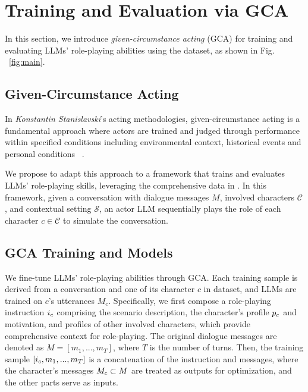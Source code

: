 
\section{Training and Evaluation via GCA}
\label{sec:method}

In this section, we introduce \textit{given-circumstance acting} (GCA) for training and evaluating LLMs' role-playing abilities using the \method dataset, as shown in Fig. ~\ref{fig:main}. 


\subsection{Given-Circumstance Acting}
\label{sec:gca}

In \textit{Konstantin Stanislavski}'s acting methodologies, given-circumstance acting is a fundamental approach where actors are trained and judged through performance within specified conditions including environmental context, historical events and personal conditions ~\citep{stanislavski2008actor}. 

We propose to adapt this approach to a framework that trains and evaluates LLMs' role-playing skills, leveraging the comprehensive data in \method.
In this framework, given a conversation with dialogue messages $M$, involved characters $\mathcal{C}$, and contextual setting $\mathcal{S}$, an actor LLM sequentially plays the role of each character $c\in\mathcal{C}$ to simulate the conversation. 

\subsection{GCA Training and \method Models}
\label{sec:training}

We fine-tune LLMs' role-playing abilities through GCA.  
Each training sample is derived from a conversation and one of its character $c$ in \method dataset, and LLMs are trained on $c$'s utterances $M_c$. 
Specifically, we first compose a role-playing instruction $i_c$ comprising the scenario description, the character's profile $p_c$ and motivation, and profiles of other involved characters,  which provide comprehensive context for role-playing. 
The original dialogue messages are denoted as $M=[m_1, ..., m_T]$, where $T$ is the number of turns. 
Then, the training sample $[i_c, m_1, ..., m_T]$ is a concatenation of the instruction and messages, where the character's messages $M_c\subset M$ are treated as outputs for optimization, and the other parts serve as inputs.  


